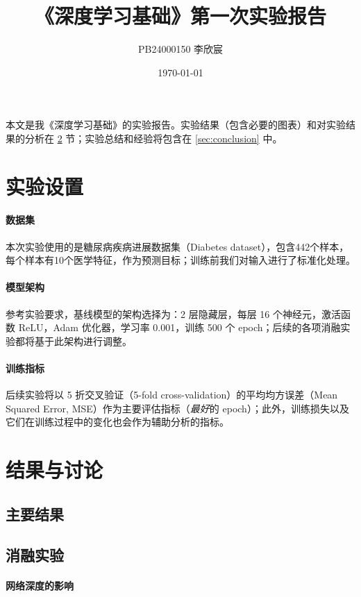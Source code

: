 \documentclass{ctexart}
\title{《深度学习基础》第一次实验报告}
\author{PB24000150 李欣宸}
\date{\today}
\begin{document}
\maketitle

本文是我《深度学习基础》的实验报告。实验结果（包含必要的图表）和对实验结果的分析在 \ref{sec:results-and-discussions} 节；实验总结和经验将包含在 \ref{sec:conclusion} 中。

\section{实验设置} \label{sec:experimental-setup}

\paragraph{数据集} 本次实验使用的是糖尿病疾病进展数据集（Diabetes dataset），包含442个样本，每个样本有10个医学特征，作为预测目标；训练前我们对输入进行了标准化处理。

\paragraph{模型架构} 参考实验要求，基线模型的架构选择为：2 层隐藏层，每层 16 个神经元，激活函数 ReLU，Adam 优化器，学习率 0.001，训练 500 个 epoch；后续的各项消融实验都将基于此架构进行调整。

\paragraph{训练指标} 后续实验将以 5 折交叉验证（5-fold cross-validation）的平均均方误差（Mean Squared Error, MSE）作为主要评估指标（\textit{最好}的 epoch）；此外，训练损失以及它们在训练过程中的变化也会作为辅助分析的指标。

\section{结果与讨论} \label{sec:results-and-discussions}

\subsection{主要结果}

\subsection{消融实验}

\paragraph{网络深度的影响}
\end{document}
